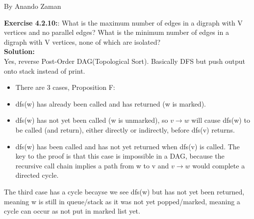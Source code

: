 \documentclass[11pt,fleqn]{article}
\begin{document}
By Anando Zaman


\textbf{Exercise 4.2.10:}: What is the maximum number of edges in a digraph with V vertices and no parallel
edges? What is the minimum number of edges in a digraph with V vertices, none of
which are isolated?\\

\textbf{Solution:}\\
Yes, reverse Post-Order DAG(Topological Sort). Basically DFS but push output onto stack instead of print.

\begin{itemize}
	\item There are 3 cases, Proposition F:
	\item dfs(w) has already been called and has returned (w is marked).
	\item dfs(w) has not yet been called (w is unmarked), so $v\rightarrow w$ will cause dfs(w) to
be called (and return), either directly or indirectly, before dfs(v) returns.
	\item dfs(w) has been called and has not yet returned when dfs(v) is called. The
key to the proof is that this case is impossible in a DAG, because the recursive
call chain implies a path from w to v and $v \rightarrow w$ would complete a directed
cycle.
\end{itemize}

The third case has a cycle becayse we see dfs(w) but has not yet been returned, meaning w is still in queue/stack as it was not yet popped/marked, meaning a cycle can occur as not put in marked list yet.

	
\end{document}
